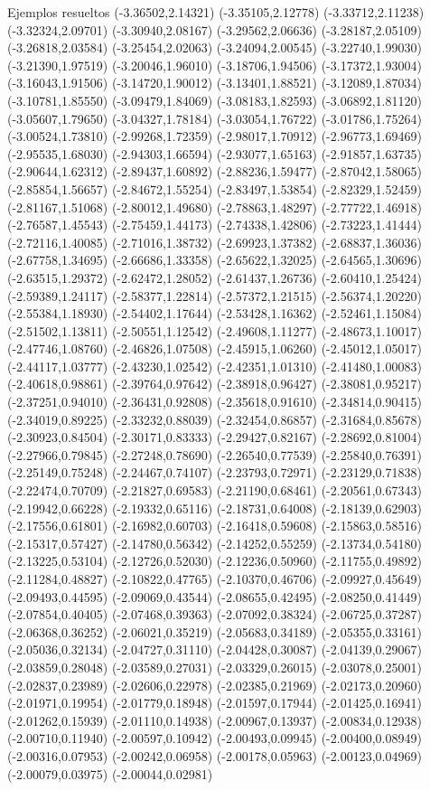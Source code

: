 \documentclass[11pt,a4paper]{article}
\begin{document}
\begin{fmex}{Ejemplos resueltos}
(-3.36502,2.14321) (-3.35105,2.12778) (-3.33712,2.11238) (-3.32324,2.09701) (-3.30940,2.08167) (-3.29562,2.06636) (-3.28187,2.05109) (-3.26818,2.03584) (-3.25454,2.02063) (-3.24094,2.00545) (-3.22740,1.99030) (-3.21390,1.97519) (-3.20046,1.96010) (-3.18706,1.94506) (-3.17372,1.93004) (-3.16043,1.91506) (-3.14720,1.90012) (-3.13401,1.88521) (-3.12089,1.87034) (-3.10781,1.85550) (-3.09479,1.84069) (-3.08183,1.82593) (-3.06892,1.81120) (-3.05607,1.79650) (-3.04327,1.78184) (-3.03054,1.76722) (-3.01786,1.75264) (-3.00524,1.73810) (-2.99268,1.72359) (-2.98017,1.70912) (-2.96773,1.69469) (-2.95535,1.68030) (-2.94303,1.66594) (-2.93077,1.65163) (-2.91857,1.63735) (-2.90644,1.62312) (-2.89437,1.60892) (-2.88236,1.59477) (-2.87042,1.58065) (-2.85854,1.56657) (-2.84672,1.55254) (-2.83497,1.53854) (-2.82329,1.52459) (-2.81167,1.51068) (-2.80012,1.49680) (-2.78863,1.48297) (-2.77722,1.46918) (-2.76587,1.45543) (-2.75459,1.44173) (-2.74338,1.42806) (-2.73223,1.41444) (-2.72116,1.40085) (-2.71016,1.38732) (-2.69923,1.37382) (-2.68837,1.36036) (-2.67758,1.34695) (-2.66686,1.33358) (-2.65622,1.32025) (-2.64565,1.30696) (-2.63515,1.29372) (-2.62472,1.28052) (-2.61437,1.26736) (-2.60410,1.25424) (-2.59389,1.24117) (-2.58377,1.22814) (-2.57372,1.21515) (-2.56374,1.20220) (-2.55384,1.18930) (-2.54402,1.17644) (-2.53428,1.16362) (-2.52461,1.15084) (-2.51502,1.13811) (-2.50551,1.12542) (-2.49608,1.11277) (-2.48673,1.10017) (-2.47746,1.08760) (-2.46826,1.07508) (-2.45915,1.06260) (-2.45012,1.05017) (-2.44117,1.03777) (-2.43230,1.02542) (-2.42351,1.01310) (-2.41480,1.00083) (-2.40618,0.98861) (-2.39764,0.97642) (-2.38918,0.96427) (-2.38081,0.95217) (-2.37251,0.94010) (-2.36431,0.92808) (-2.35618,0.91610) (-2.34814,0.90415) (-2.34019,0.89225) (-2.33232,0.88039) (-2.32454,0.86857) (-2.31684,0.85678) (-2.30923,0.84504) (-2.30171,0.83333) (-2.29427,0.82167) (-2.28692,0.81004) (-2.27966,0.79845) (-2.27248,0.78690) (-2.26540,0.77539) (-2.25840,0.76391) (-2.25149,0.75248) (-2.24467,0.74107) (-2.23793,0.72971) (-2.23129,0.71838) (-2.22474,0.70709) (-2.21827,0.69583) (-2.21190,0.68461) (-2.20561,0.67343) (-2.19942,0.66228) (-2.19332,0.65116) (-2.18731,0.64008) (-2.18139,0.62903) (-2.17556,0.61801) (-2.16982,0.60703) (-2.16418,0.59608) (-2.15863,0.58516) (-2.15317,0.57427) (-2.14780,0.56342) (-2.14252,0.55259) (-2.13734,0.54180) (-2.13225,0.53104) (-2.12726,0.52030) (-2.12236,0.50960) (-2.11755,0.49892) (-2.11284,0.48827) (-2.10822,0.47765) (-2.10370,0.46706) (-2.09927,0.45649) (-2.09493,0.44595) (-2.09069,0.43544) (-2.08655,0.42495) (-2.08250,0.41449) (-2.07854,0.40405) (-2.07468,0.39363) (-2.07092,0.38324) (-2.06725,0.37287) (-2.06368,0.36252) (-2.06021,0.35219) (-2.05683,0.34189) (-2.05355,0.33161) (-2.05036,0.32134) (-2.04727,0.31110) (-2.04428,0.30087) (-2.04139,0.29067) (-2.03859,0.28048) (-2.03589,0.27031) (-2.03329,0.26015) (-2.03078,0.25001) (-2.02837,0.23989) (-2.02606,0.22978) (-2.02385,0.21969) (-2.02173,0.20960) (-2.01971,0.19954) (-2.01779,0.18948) (-2.01597,0.17944) (-2.01425,0.16941) (-2.01262,0.15939) (-2.01110,0.14938) (-2.00967,0.13937) (-2.00834,0.12938) (-2.00710,0.11940) (-2.00597,0.10942) (-2.00493,0.09945) (-2.00400,0.08949) (-2.00316,0.07953) (-2.00242,0.06958) (-2.00178,0.05963) (-2.00123,0.04969) (-2.00079,0.03975) (-2.00044,0.02981) 
\end{fmex}
\end{document}
